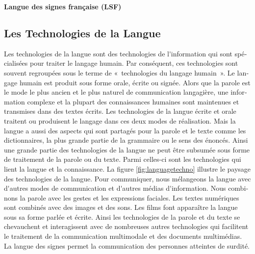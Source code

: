 \begin{french}
\begin{multicols}{2}
{\bf Langue des signes française (LSF)}\\

\end{multicols}

\clearpage


\begin{multicols}{2}

\subsection{Les Technologies de la Langue}

Les technologies de la langue sont des technologies de l{\mbox '}information
qui sont spécialisées pour traiter le langage humain. Par conséquent,
ces technologies sont souvent regroupées sous le terme de «~technologies
du langage humain~». Le langage humain est produit sous forme orale,
écrite ou signée. Alors que la parole est le mode le plus ancien et le
plus naturel de communication langagière, une information complexe et
la plupart des connaissances humaines sont maintenues et transmises
dans des textes écrits. Les technologies de la langue écrite et orale
traitent ou produisent le langage dans ces deux modes de
réalisation. Mais la langue a aussi des aspects qui sont partagés pour
la parole et le texte comme les dictionnaires, la plus grande partie
de la grammaire ou le sens des énoncés. Ainsi une grande partie des
technologies de la langue ne peut être subsumée sous forme de
traitement de la parole ou du texte. Parmi celles-ci sont les
technologies qui lient la langue et la connaissance. La figure
\ref{fig:languagetechno} illustre le paysage des technologies de la
langue. Pour communiquer, nous mélangeons la langue avec d{\mbox '}autres
modes de communication et d{\mbox '}autres médias d{\mbox '}information. Nous
combinons la parole avec les gestes et les expressions faciales. Les
textes numériques sont combinés avec des images et des sons. Les films
font apparaître la langue sous sa forme parlée et écrite. Ainsi les
technologies de la parole et du texte se chevauchent et interagissent
avec de nombreuses autres technologies qui facilitent le traitement de
la communication multimodale et des documents multimédias.  La langue
des signes permet la communication des personnes atteintes de surdité.

\begin{figure}[!ht]


\end{figure}
\end{multicols}
\end{french}
